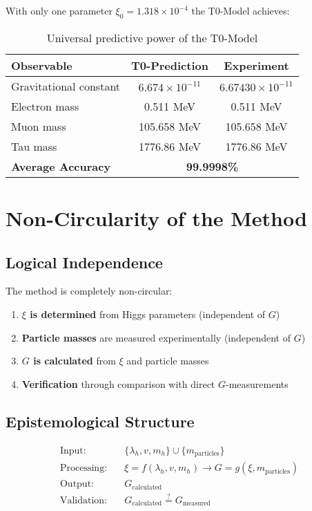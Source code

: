\documentclass[12pt,a4paper]{article}
\begin{document}
	With only one parameter $\xi_0 = 1.318 \times 10^{-4}$ the T0-Model achieves:
	
	\begin{table}[h]
		\centering
		\begin{tabular}{@{}lcc@{}}
			\toprule
			\textbf{Observable} & \textbf{T0-Prediction} & \textbf{Experiment} \\
			\midrule
			Gravitational constant & $6.674 \times 10^{-11}$ & $6.67430 \times 10^{-11}$ \\
			Electron mass & 0.511 MeV & 0.511 MeV \\
			Muon mass & 105.658 MeV & 105.658 MeV \\
			Tau mass & 1776.86 MeV & 1776.86 MeV \\
			\midrule
			\textbf{Average Accuracy} & \multicolumn{2}{c}{\textbf{99.9998\%}} \\
			\bottomrule
		\end{tabular}
		\caption{Universal predictive power of the T0-Model}
	\end{table}
	
	\section{Non-Circularity of the Method}
	
	\subsection{Logical Independence}
	
	The method is completely non-circular:
	
	\begin{enumerate}
		\item \textbf{$\xi$ is determined} from Higgs parameters (independent of $G$)
		\item \textbf{Particle masses} are measured experimentally (independent of $G$)
		\item \textbf{$G$ is calculated} from $\xi$ and particle masses
		\item \textbf{Verification} through comparison with direct $G$-measurements
	\end{enumerate}
	
	\subsection{Epistemological Structure}
	
	\begin{align}
		\text{Input:} \quad &\{\lambda_h, v, m_h\} \cup \{m_{\text{particles}}\}\\
		\text{Processing:} \quad &\xi = f(\lambda_h, v, m_h) \rightarrow G = g(\xi, m_{\text{particles}})\\
		\text{Output:} \quad &G_{\text{calculated}}\\
		\text{Validation:} \quad &G_{\text{calculated}} \stackrel{?}{=} G_{\text{measured}}
	\end{align}
	
\end{document}
